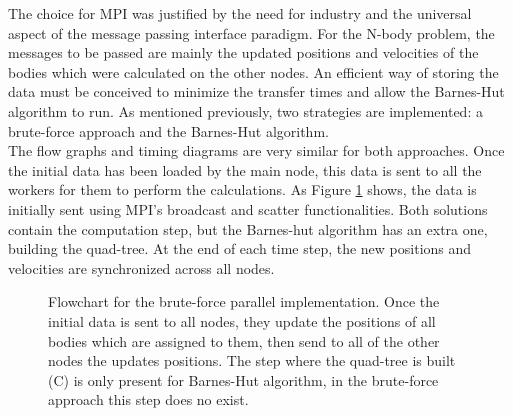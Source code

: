 The choice for MPI was justified by the need for industry and the universal aspect of the message passing interface paradigm. For the N-body problem, the messages to be passed are mainly the updated positions and velocities of the bodies which were calculated on the other nodes. An efficient way of storing the data must be conceived to minimize the transfer times and allow the Barnes-Hut algorithm to run. As mentioned previously, two strategies are implemented: a brute-force approach and the Barnes-Hut algorithm.\\
The flow graphs and timing diagrams are very similar for both approaches. Once the initial data has been loaded by the main node, this data is sent to all the workers for them to perform the calculations. As Figure \ref{fig:flow_chart} shows, the data is initially sent using MPI's broadcast and scatter functionalities. Both solutions contain the computation step, but the Barnes-hut algorithm has an extra one, building the quad-tree. At the end of each time step, the new positions and velocities are synchronized across all nodes.\\
\begin{figure}[H]
\centering
{}
\caption{Flowchart for the brute-force parallel implementation. Once the initial data is sent to all nodes, they update the positions of all bodies which are assigned to them, then send to all of the other nodes the updates positions. The step where the quad-tree is built (C) is only present for Barnes-Hut algorithm, in the brute-force approach this step does no exist.}
\label{fig:flow_chart}
\end{figure}
